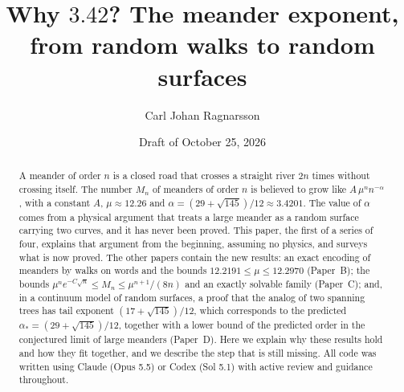 \documentclass[11pt]{article}
\title{Why $3.42$? The meander exponent,\\ from random walks to random surfaces\seriesline{Paper A.}}
\author{Carl Johan Ragnarsson}
\date{Draft of October 25, 2026}
\begin{document}
\maketitle

\begin{abstract}
A meander of order $n$ is a closed road that crosses a straight river $2n$ times without
crossing itself. The number $M_n$ of meanders of order $n$ is believed to grow like
$A\,\mu^n n^{-\alpha}$, with a constant $A$, $\mu\approx 12.26$ and
$\alpha=(29+\sqrt{145})/12\approx 3.4201$. The value of $\alpha$ comes from a physical argument
that treats a large meander as a random surface carrying two curves, and it has never been
proved. This paper, the first of a series of four, explains that argument from the beginning,
assuming no physics, and surveys what is now proved. The other papers contain the new results:
an exact encoding of meanders by walks on words and the bounds $12.2191\le\mu\le12.2970$
(Paper~B); the bounds $\mu^n e^{-C\sqrt n}\le M_n\le\mu^{n+1}/(8n)$ and an exactly solvable family
(Paper~C); and, in a continuum model of random surfaces, a proof that the analog of two spanning
trees has tail exponent $(17+\sqrt{145})/12$, which corresponds to the predicted
$\alpha_*=(29+\sqrt{145})/12$, together with a lower bound of the
predicted order in the conjectured limit of large meanders (Paper~D). Here we explain why these results hold and how they fit
together, and we describe the step that is still missing. All code was written using Claude
(Opus 5.5) or Codex (Sol 5.1) with active review and guidance throughout.
\end{abstract}

\tableofcontents








\clearpage
\appendix


\clearpage


\end{document}

